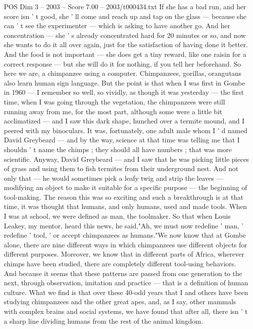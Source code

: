 \begin{textsample}{POS Dim 3 – 2003 – Score 7.00 – 2003/t000434.txt}
If she has a bad run, and her score isn ' t good, she ' ll come and reach up and tap on the glass — because she can ' t see the experimenter — which is asking to have another go.
And her concentration — she ' s already concentrated hard for 20 minutes or so, and now she wants to do it all over again, just for the satisfaction of having done it better.
And the food is not important — she does get a tiny reward, like one raisin for a correct response — but she will do it for nothing, if you tell her beforehand.
So here we are, a chimpanzee using a computer.
Chimpanzees, gorillas, orangutans also learn human sign language.
But the point is that when I was first in Gombe in 1960 — I remember so well, so vividly, as though it was yesterday — the first time, when I was going through the vegetation, the chimpanzees were still running away from me, for the most part, although some were a little bit acclimatized — and I saw this dark shape, hunched over a termite mound, and I peered with my binoculars.
It was, fortunately, one adult male whom I ' d named David Greybeard — and by the way, science at that time was telling me that I shouldn ' t name the chimps ; they should all have numbers ; that was more scientific.
Anyway, David Greybeard — and I saw that he was picking little pieces of grass and using them to fish termites from their underground nest.
And not only that — he would sometimes pick a leafy twig and strip the leaves — modifying an object to make it suitable for a specific purpose — the beginning of tool-making.
The reason this was so exciting and such a breakthrough is at that time, it was thought that humans, and only humans, used and made tools.
When I was at school, we were defined as man, the toolmaker.
So that when Louis Leakey, my mentor, heard this news, he said,"Ah, we must now redefine ' man, ' redefine ' tool, ' or accept chimpanzees as humans."We now know that at Gombe alone, there are nine different ways in which chimpanzees use different objects for different purposes.
Moreover, we know that in different parts of Africa, wherever chimps have been studied, there are completely different tool-using behaviors.
And because it seems that these patterns are passed from one generation to the next, through observation, imitation and practice — that is a definition of human culture.
What we find is that over these 40-odd years that I and others have been studying chimpanzees and the other great apes, and, as I say, other mammals with complex brains and social systems, we have found that after all, there isn ' t a sharp line dividing humans from the rest of the animal kingdom.

\end{textsample}
